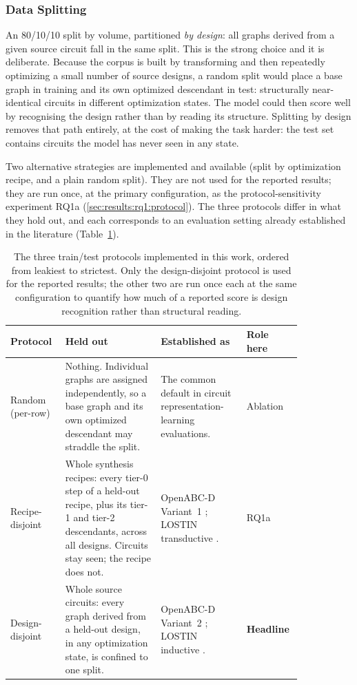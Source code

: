 \subsubsection{Data Splitting}
\label{sec:method:experiment:splitting}
An 80/10/10 split by volume, partitioned \emph{by design}: all graphs derived from a given
source circuit fall in the same split. This is the strong choice and it is deliberate.
Because the corpus is built by transforming and then repeatedly optimizing a small number of
source designs, a random split would place a base graph in training and its own optimized
descendant in test: structurally near-identical circuits in different optimization states.
The model could then score well by recognising the design rather than by reading its
structure. Splitting by design removes that path entirely, at the cost of making the task
harder: the test set contains circuits the model has never seen in any state.

Two alternative strategies are implemented and available (split by optimization recipe, and
a plain random split). They are not used for the reported results; they are run once, at the
primary configuration, as the protocol-sensitivity experiment RQ1a
(\ref{sec:results:rq1:protocol}).
The three protocols differ in what they hold out, and each corresponds to an evaluation
setting already established in the literature (Table~\ref{tab:split_protocols}).

\begin{table}[htbp]
\centering
\caption{The three train/test protocols implemented in this work, ordered from leakiest to
strictest. Only the design-disjoint protocol is used for the reported results; the other two
are run once each at the same configuration to quantify how much of a reported score is
design recognition rather than structural reading.}
\label{tab:split_protocols}
\small
\begin{tabular}{@{}p{0.15\linewidth}p{0.30\linewidth}p{0.27\linewidth}p{0.12\linewidth}@{}}
\toprule
\textbf{Protocol} & \textbf{Held out} & \textbf{Established as} & \textbf{Role here} \\
\midrule
Random (per-row)
& Nothing. Individual graphs are assigned independently, so a base graph and its own
  optimized descendant may straddle the split.
& The common default in circuit representation-learning evaluations.
& Ablation \\[4pt]
Recipe-disjoint
& Whole synthesis recipes: every tier-0 step of a held-out recipe, plus its tier-1 and
  tier-2 descendants, across all designs. Circuits stay seen; the recipe does not.
& OpenABC-D Variant~1 \citep{chowdhury2021openabc}; LOSTIN transductive
  \citep{wu2022lostin}.
& RQ1a \\[4pt]
Design-disjoint
& Whole source circuits: every graph derived from a held-out design, in any optimization
  state, is confined to one split.
& OpenABC-D Variant~2 \citep{chowdhury2021openabc}; LOSTIN inductive
  \citep{wu2022lostin}.
& \textbf{Headline} \\
\bottomrule
\end{tabular}
\end{table}

